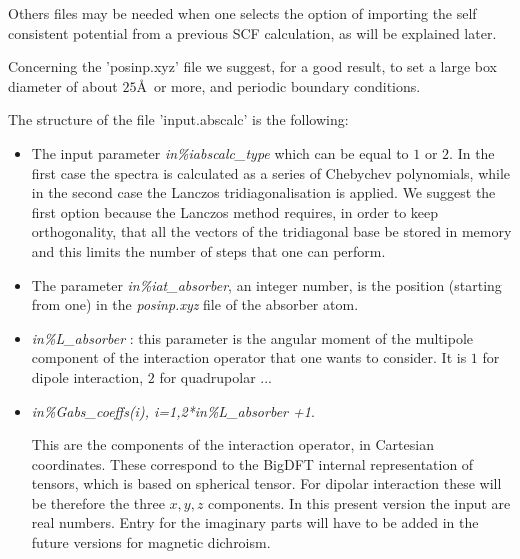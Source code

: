 \documentclass[a4paper,11pt]{report}
\begin{document}
Others files may be needed when one selects the option of importing
the self consistent potential from a previous SCF calculation, as will
be explained later. 

Concerning the '{posinp.xyz}' file we suggest, for a good result,
to set a large box diameter of about $25$\AA\ or more, and periodic
boundary conditions.

The structure of the file '{input.abscalc}' is the following:

\begin{itemize}
\item The input parameter {\it in\%iabscalc\_type} which can be equal to  $1$
or $2$. In the first case the spectra is calculated as a series of
Chebychev polynomials, while in the second case the Lanczos
tridiagonalisation is applied. We suggest the first option
because the Lanczos method requires, in order to keep orthogonality,
 that all the vectors of the tridiagonal base be stored in memory
and this limits the number of steps that one can perform.

\item The  parameter {\it in\%iat\_absorber}, an integer number,
is the position (starting from one) in  the {\it posinp.xyz} file
of the absorber atom.

\item  {\it in\%L\_absorber} : this parameter is the angular moment
of the multipole component of the interaction operator that 
one wants to consider. It is $1$ for dipole interaction, $2$ for
quadrupolar ...

\item {\it in\%Gabs\_coeffs(i), i=1,2*in\%L\_absorber +1}.

This are the components of the interaction operator, in Cartesian
coordinates. These correspond to the BigDFT internal representation 
of tensors, which is based on spherical tensor. 
For dipolar interaction these will be therefore the three $x,y,z$
components. In this present version the input are real numbers.
Entry for the imaginary parts will have to be added in the future versions 
for magnetic dichroism.


\end{itemize}
\end{document}
